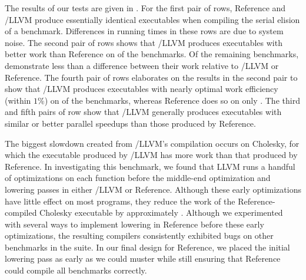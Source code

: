 The results of our tests are given in .  For the
first pair of rows, Reference and \tapir/LLVM produce essentially
identical executables when compiling the serial elision of a
benchmark.  Differences in running times in these rows are due to
system noise.  The second pair of rows shows that \tapir/LLVM produces
executables with better work than Reference on 
of the benchmarks.  Of the remaining  benchmarks,
 demonstrate less than a 
difference between their work relative to \tapir/LLVM or Reference.
The fourth pair of rows elaborates on the results in the second pair
to show that \tapir/LLVM produces executables with nearly optimal work
efficiency (within $1\%$) on  of the benchmarks,
whereas Reference does so on only .  The third and
fifth pairs of row show that \tapir/LLVM generally produces
executables with similar or better parallel speedups than those
produced by Reference.

The biggest slowdown created from \tapir/LLVM's compilation occurs on
Cholesky, for which the executable produced by \tapir/LLVM has
 more work than that produced by Reference.  In
investigating this benchmark, we found that LLVM runs a handful of
optimizations on each function before the middle-end optimization and
lowering passes in either \tapir/LLVM or Reference.  Although these
early optimizations have little effect on most programs, they reduce
the work of the Reference-compiled Cholesky executable by
approximately .  Although we experimented with
several ways to implement lowering in Reference before these early
optimizations, the resulting compilers consistently exhibited bugs on
other benchmarks in the suite.  In our final design for Reference, we
placed the initial lowering pass as early as we could muster while
still ensuring that Reference could compile all benchmarks correctly.


